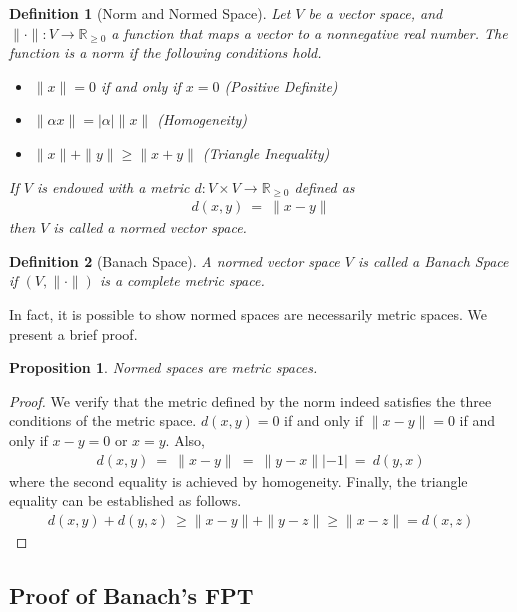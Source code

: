 \documentclass[10pt]{article}
\numberwithin{equation}{section}
\newtheorem{proposition}{Proposition}
\newtheorem{definition}{Definition}
\numberwithin{theorem}{section}
\numberwithin{proposition}{section}
\numberwithin{lemma}{section}
\numberwithin{corollary}{section}
\numberwithin{remark}{section}
\numberwithin{definition}{section}
\numberwithin{example}{section}
\numberwithin{conjecture}{section}
\numberwithin{question}{section}
\begin{document}
\begin{definition}[Norm and Normed Space]
    Let $V$ be a vector space, and $\|\cdot\|:V\rightarrow \mathbb R_{\geq 0}$ 
    a function that maps a vector to a nonnegative real number. The function 
    is a norm if the following conditions hold. 
    \begin{itemize}
        \item $\|x\| = 0$ if and only if $x = 0$ \rm{(Positive Definite)}
        \item $\|\alpha x\| = |\alpha| \|x\|$ \rm{(Homogeneity)}
        \item $\|x\| + \|y\| \geq \|x + y\|$ \rm{(Triangle Inequality)}
    \end{itemize}
    If $V$ is endowed with a metric $d:V\times V \rightarrow \mathbb R_{\geq 0}$ 
    defined as 
    \begin{align}
        d(x, y) \ = \ \|x-y\|
    \end{align}
    then $V$ is called a normed vector space. 
\end{definition}

\begin{definition}[Banach Space] 
    A normed vector space $V$ is called a Banach Space if $(V, \|\cdot\|)$ is 
    a complete metric space. 
\end{definition}

In fact, it is possible to show normed spaces are necessarily metric spaces. We 
present a brief proof. 
\begin{proposition}
    Normed spaces are metric spaces. 
\end{proposition}
\begin{proof}
    We verify that the metric defined by the norm indeed satisfies 
    the three conditions of the metric space. $d(x, y) = 0$ if 
    and only if $\|x - y\| = 0$ if and only if $x - y = 0$ or $x = y$. 
    Also, \begin{align}
        d(x, y) \ = \ \|x - y\| \ = \ \|y - x\||-1| \ = \ d(y, x)
    \end{align} where the second equality is achieved by homogeneity. 
    Finally, the triangle equality can be established as follows. 
    \begin{align}
        d(x, y) + d(y, z) \ \geq \|x - y\| + \|y - z\| \geq \|x - z\| = d(x, z)
    \end{align}
\end{proof}

\subsection{Proof of Banach's FPT}
\end{document}
